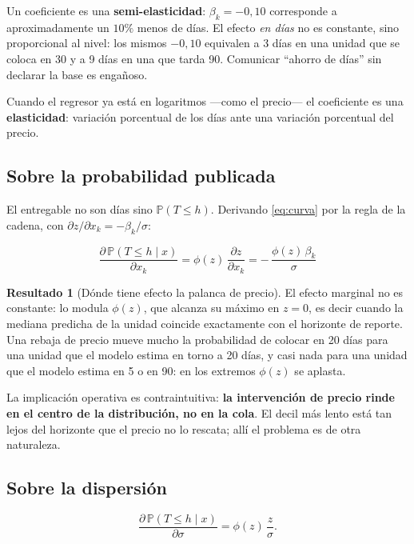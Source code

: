 \documentclass[11pt,a4paper]{article}
\theoremstyle{definition}
\newtheorem{resultado}{Resultado}
\newcommand{\Prob}{\mathbb{P}}
\begin{document}
Un coeficiente es una \textbf{semi-elasticidad}: $\beta_k=-0{,}10$ corresponde a
aproximadamente un $10\%$ menos de días. El efecto \emph{en días} no es
constante, sino proporcional al nivel: los mismos $-0{,}10$ equivalen a 3 días en
una unidad que se coloca en 30 y a 9 días en una que tarda 90. Comunicar
``ahorro de días'' sin declarar la base es engañoso.

Cuando el regresor ya está en logaritmos ---como el precio--- el coeficiente es
una \textbf{elasticidad}: variación porcentual de los días ante una variación
porcentual del precio.

\subsection{Sobre la probabilidad publicada}

El entregable no son días sino $\Prob(T\le h)$. Derivando \eqref{eq:curva} por la
regla de la cadena, con $\partial z/\partial x_k=-\beta_k/\sigma$:

\begin{equation}
\boxed{\ \frac{\partial\,\Prob(T\le h\mid x)}{\partial x_k}
=\phi(z)\,\frac{\partial z}{\partial x_k}
=-\,\frac{\phi(z)\,\beta_k}{\sigma}\ }
\label{eq:dprob}
\end{equation}

\begin{resultado}[Dónde tiene efecto la palanca de precio]
El efecto marginal no es constante: lo modula $\phi(z)$, que alcanza su máximo en
$z=0$, es decir cuando la mediana predicha de la unidad coincide exactamente con
el horizonte de reporte. Una rebaja de precio mueve mucho la probabilidad de
colocar en 20 días para una unidad que el modelo estima en torno a 20 días, y
casi nada para una unidad que el modelo estima en 5 o en 90: en los extremos
$\phi(z)$ se aplasta.

La implicación operativa es contraintuitiva: \textbf{la intervención de precio
rinde en el centro de la distribución, no en la cola}. El decil más lento está
tan lejos del horizonte que el precio no lo rescata; allí el problema es de otra
naturaleza.
\end{resultado}

\subsection{Sobre la dispersión}

\begin{equation}
\frac{\partial\,\Prob(T\le h\mid x)}{\partial \sigma}
=\phi(z)\,\frac{z}{\sigma}.
\label{eq:dsigma}
\end{equation}
\end{document}
